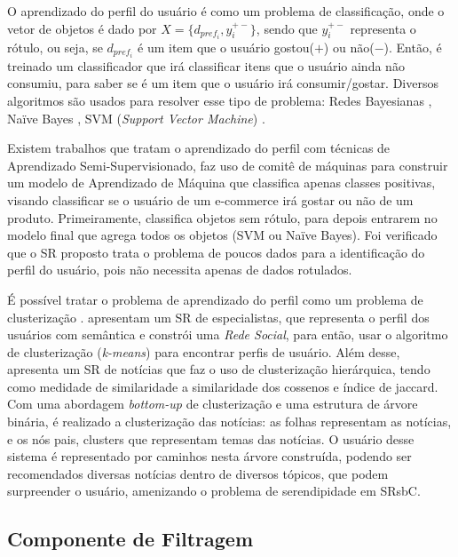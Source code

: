 \documentclass[
    12pt,                %
    oneside,            %
    a4paper,            %
    english,            %
    brazil                %
    ]{abntex2ppgsi}
\begin{document}
O aprendizado do perfil do usuário é como um problema de classificação, onde o vetor de objetos é dado por $X = \{d_{pref_i}, y^{+-}_i\}$, sendo que $y^{+-}_i$ representa o rótulo, ou seja, se $d_{pref_i}$ é um item que o usuário gostou($+$) ou não($-$).
Então, é treinado um classificador que irá classificar itens que o usuário ainda não consumiu, para saber se é um item que o usuário irá consumir/gostar.
Diversos algoritmos são usados para resolver esse tipo de problema: Redes Bayesianas \cite{Yeung2012, Cleger2012}, Naïve Bayes \cite{Lee2012, Semeraro2012}, SVM (\textit{Support Vector Machine}) \cite{Tantanasiriwong2012, Lee2012}.

Existem trabalhos que tratam o aprendizado do perfil com técnicas de Aprendizado Semi-Supervisionado,  faz uso de comitê de máquinas para construir um modelo de Aprendizado de Máquina que classifica apenas classes positivas, visando classificar se o usuário de um e-commerce irá gostar ou não de um produto. Primeiramente, classifica objetos sem rótulo, para depois entrarem no modelo final que agrega todos os objetos (SVM ou Naïve Bayes).
Foi verificado que o SR proposto trata o problema de poucos dados para a identificação do perfil do usuário, pois não necessita apenas de dados rotulados.

É possível tratar o problema de aprendizado do perfil como um problema de clusterização \cite{Davoodi2012, Bielikova2012}.
 apresentam um SR de especialistas, que representa o perfil dos usuários com semântica e constrói uma \textit{Rede Social}, para então, usar o algoritmo de clusterização (\textit{k-means}) para encontrar perfis de usuário.
Além desse, \cite{Bielikova2012} apresenta um SR de notícias que faz o uso de clusterização hierárquica, tendo como medidade de similaridade a similaridade dos cossenos e índice de jaccard.
Com uma abordagem \textit{bottom-up} de clusterização e uma estrutura de árvore binária, é realizado a clusterização das notícias: as folhas representam as notícias, e os nós pais, clusters que representam temas das notícias.
O usuário desse sistema é representado por caminhos nesta árvore construída, podendo ser recomendados diversas notícias dentro de diversos tópicos, que podem surpreender o usuário, amenizando o problema de serendipidade em SRsbC.

\subsection{Componente de Filtragem}
\label{subsec:filtragem}
\end{document}
